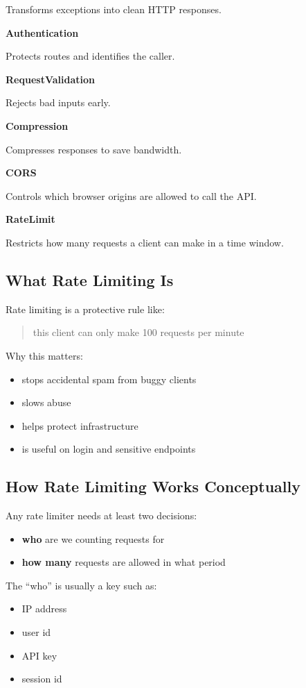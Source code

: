 \documentclass[11pt,a4paper]{article}
\begin{document}
Transforms exceptions into clean HTTP responses.

\textbf{Authentication}

Protects routes and identifies the caller.

\textbf{RequestValidation}

Rejects bad inputs early.

\textbf{Compression}

Compresses responses to save bandwidth.

\textbf{CORS}

Controls which browser origins are allowed to call the API.

\textbf{RateLimit}

Restricts how many requests a client can make in a time window.

\subsection{What Rate Limiting Is}

Rate limiting is a protective rule like:
\begin{quote}
this client can only make 100 requests per minute
\end{quote}

Why this matters:
\begin{itemize}
    \item stops accidental spam from buggy clients
    \item slows abuse
    \item helps protect infrastructure
    \item is useful on login and sensitive endpoints
\end{itemize}

\subsection{How Rate Limiting Works Conceptually}

Any rate limiter needs at least two decisions:
\begin{itemize}
    \item \textbf{who} are we counting requests for
    \item \textbf{how many} requests are allowed in what period
\end{itemize}

The ``who'' is usually a key such as:
\begin{itemize}
    \item IP address
    \item user id
    \item API key
    \item session id
\end{itemize}
\end{document}
